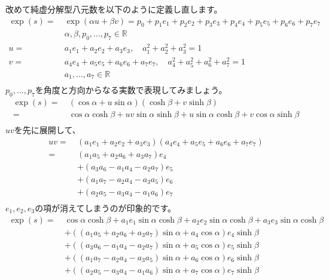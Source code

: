 \documentclass[a4paper,12pt,notitlepage]{jsreport}
\begin{document}
改めて純虚分解型八元数を以下のように定義し直します。
\begin{equation}
\begin{split}
\exp(s)=~&\exp(\alpha u+\beta v)=p_0+p_1e_1+p_2e_2+p_3e_3+p_4e_4+p_5e_5+p_6e_6+p_7e_7\\
&\alpha,\beta,p_0,...,p_7\in\mathbb{R}\\
u=~&a_1e_1+a_2e_2+a_3e_3,\quad a_1^2+a_2^2+a_3^2=1\\
v=~&a_4e_4+a_5e_5+a_6e_6+a_7e_7,\quad a_4^2+a_5^2+a_6^2+a_7^2=1\\
&a_1,...,a_7\in\mathbb{R}\\
\end{split}
\end{equation}
$p_0,...,p_7$を角度と方向からなる実数で表現してみましょう。
\begin{equation}
\begin{split}
\exp(s)=~&(\cos\alpha+u\sin\alpha)(\cosh\beta+v\sinh\beta)\\
=~&\cos\alpha\cosh\beta+uv\sin\alpha\sinh\beta+u\sin\alpha\cosh\beta+v\cos\alpha\sinh\beta\\
\end{split}
\end{equation}
$uv$を先に展開して、
\begin{equation}
\begin{split}
uv=~&(a_1e_1+a_2e_2+a_3e_3)(a_4e_4+a_5e_5+a_6e_6+a_7e_7)\\
=~&(a_1a_5+a_2a_6+a_3a_7)e_4\\
&+(a_3a_6-a_1a_4-a_2a_7)e_5\\
&+(a_1a_7-a_2a_4-a_3a_5)e_6\\
&+(a_2a_5-a_3a_4-a_1a_6)e_7\\
\end{split}
\end{equation}
$e_1,e_2,e_3$の項が消えてしまうのが印象的です。
\begin{equation}
\begin{split}
\exp(s)=~&\cos\alpha\cosh\beta+a_1e_1\sin\alpha\cosh\beta+a_2e_2\sin\alpha\cosh\beta+a_3e_3\sin\alpha\cosh\beta\\
&+((a_1a_5+a_2a_6+a_3a_7)\sin\alpha+a_4\cos\alpha)e_4\sinh\beta\\
&+((a_3a_6-a_1a_4-a_2a_7)\sin\alpha+a_5\cos\alpha)e_5\sinh\beta\\
&+((a_1a_7-a_2a_4-a_3a_5)\sin\alpha+a_6\cos\alpha)e_6\sinh\beta\\
&+((a_2a_5-a_3a_4-a_1a_6)\sin\alpha+a_7\cos\alpha)e_7\sinh\beta\\
\end{split}
\end{equation}
\end{document}
